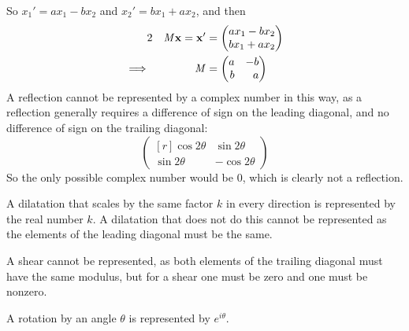 \documentclass[fleqn,a4paper,11pt]{article}
\begin{document}
\begin{enumerate}[label=\textbf{\arabic*.}]
\begin{enumerate}[label=(\alph*)]
      So \(x_1' = ax_1 - bx_2\) and \(x_2' = bx_1 + ax_2\), and then
      \begin{alignat*}2
       && \mat M \vec x = \vec x' &=
       \begin{pmatrix}
        ax_1 - bx_2 \\ bx_1 + ax_2
       \end{pmatrix} \\
       \implies{}&& \mat M &=
       \begin{pmatrix*}[r]
        a & -b \\
        b & a
       \end{pmatrix*}
      \end{alignat*}
      A reflection cannot be represented by a complex number in this way, as a
      reflection generally requires a difference of sign on the leading
      diagonal, and no difference of sign on the trailing diagonal:
      \begin{equation*}
       \begin{pmatrix*}[r]
        \cos 2\theta & \sin 2\theta \\
        \sin 2\theta & -\cos 2\theta
       \end{pmatrix*}
      \end{equation*}
      So the only possible complex number would be \(0\), which is clearly not a
      reflection.

      A dilatation that scales by the same factor \(k\) in every direction is
      represented by the real number \(k\). A dilatation that does not do this
      cannot be represented as the elements of the leading diagonal must be the
      same.

      A shear cannot be represented, as both elements of the trailing diagonal
      must have the same modulus, but for a shear one must be zero and one must
      be nonzero.

      A rotation by an angle \(\theta\) is represented by \(e^{i\theta}\).
    \end{enumerate}
 \end{enumerate}
\end{document}
